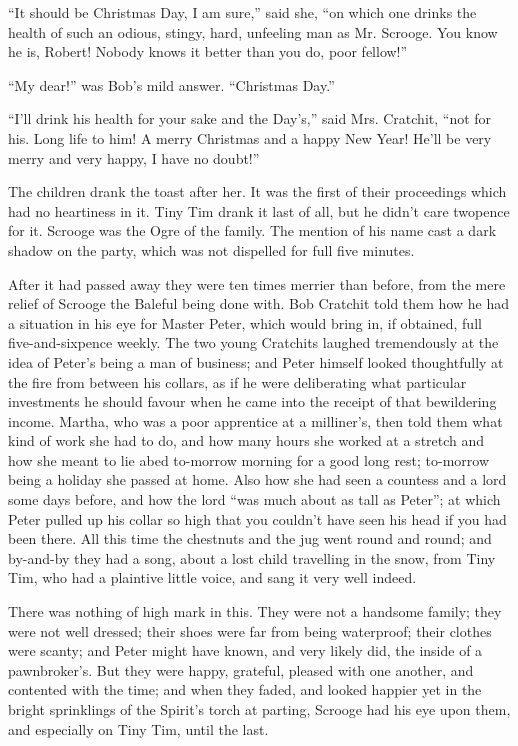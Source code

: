 \documentclass[paper=a5,BCOR=15mm,twoside,DIV=15,headinclude=off,12pt,chapterprefix=off,openany,headings=huge]{scrbook} %
\begin{document}
\enquote{It should be Christmas Day, I am sure,} said she, \enquote{on which one drinks the health of such an odious, stingy, hard, unfeeling man as Mr. Scrooge. You know he is, Robert! Nobody knows it better than you do, poor fellow!}

\enquote{My dear!} was Bob's mild answer. \enquote{Christmas Day.}

\enquote{I'll drink his health for your sake and the Day's,} said Mrs. Cratchit, \enquote{not for his. Long life to him! A merry Christmas and a happy New Year! He'll be very merry and very happy, I have no doubt!}

The children drank the toast after her. It was the first of their proceedings which had no heartiness in it. Tiny Tim drank it last of all, but he didn't care twopence for it. Scrooge was the Ogre of the family. The mention of his name cast a dark shadow on the party, which was not dispelled for full five minutes.

After it had passed away they were ten times merrier than before, from the mere relief of Scrooge the Baleful being done with. Bob Cratchit told them how he had a situation in his eye for Master Peter, which would bring in, if obtained, full five-and-sixpence weekly. The two young Cratchits laughed tremendously at the idea of Peter's being a man of business; and Peter himself looked thoughtfully at the fire from between his collars, as if he were deliberating what particular investments he should favour when he came into the receipt of that bewildering income. Martha, who was a poor apprentice at a milliner's, then told them what kind of work she had to do, and how many hours she worked at a stretch and how she meant to lie abed to-morrow morning for a good long rest; to-morrow being a holiday she passed at home. Also how she had seen a countess and a lord some days before, and how the lord \enquote{was much about as tall as Peter}; at which Peter pulled up his collar so high that you couldn't have seen his head if you had been there. All this time the chestnuts and the jug went round and round; and by-and-by they had a song, about a lost child travelling in the snow, from Tiny Tim, who had a plaintive little voice, and sang it very well indeed.

There was nothing of high mark in this. They were not a handsome family; they were not well dressed; their shoes were far from being waterproof; their clothes were scanty; and Peter might have known, and very likely did, the inside of a pawnbroker's. But they were happy, grateful, pleased with one another, and contented with the time; and when they faded, and looked happier yet in the bright sprinklings of the Spirit's torch at parting, Scrooge had his eye upon them, and especially on Tiny Tim, until the last.
\end{document}

